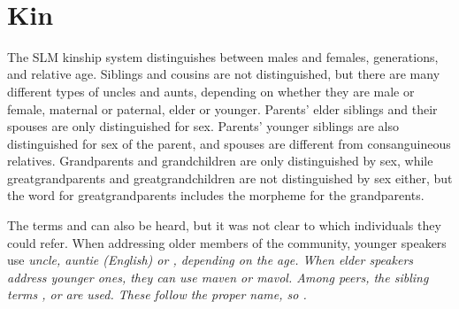 \\

\section{Kin}\label{sec:func:Kin}
The SLM kinship system distinguishes between males and females, generations, and relative age. Siblings and cousins are not distinguished, but there are many different types of uncles and aunts, depending on whether they are male or female, maternal or paternal, elder or younger. Parents' elder siblings and their spouses are only distinguished for sex. Parents' younger siblings are also distinguished for sex of the parent, and spouses are different from consanguineous relatives.  Grandparents and grandchildren are only distinguished by sex, while greatgrandparents and greatgrandchildren are not distinguished by sex either, but the word for greatgrandparents includes the morpheme for the grandparents.

The terms  and  can also be heard, but it was not clear to which individuals they could refer. When addressing older members of the community, younger speakers use \em uncle, auntie \em (English) or , depending on the age. When elder speakers address younger ones, they can use \em maven \em or \em mavol\em. Among peers, the sibling terms ,  or  are used. These follow the proper name, so .


